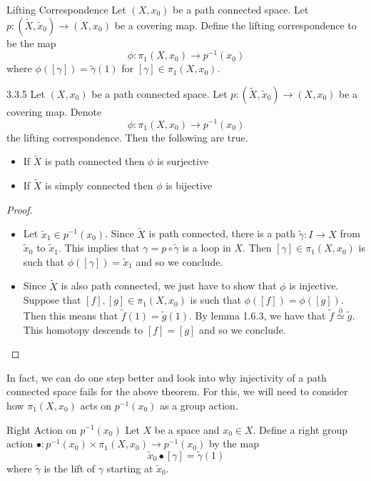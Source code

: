 \documentclass[a4paper]{article}
\begin{document}
\begin{defn}{Lifting Correspondence}{} Let $(X,x_0)$ be a path connected space. Let $p:(\widetilde{X},\widetilde{x}_0)\to(X,x_0)$ be a covering map. Define the lifting correspondence to be the map $$\phi:\pi_1(X,x_0)\to p^{-1}(x_0)$$ where $\phi([\gamma])=\widetilde{\gamma}(1)$ for $[\gamma]\in\pi_1(X,x_0)$. 
\end{defn}

\begin{thm}{}{3.3.5} Let $(X,x_0)$ be a path connected space. Let $p:(\widetilde{X},\widetilde{x}_0)\to(X,x_0)$ be a covering map. Denote $$\phi:\pi_1(X,x_0)\to p^{-1}(x_0)$$ the lifting correspondence. Then the following are true. 
\begin{itemize}
\item If $\widetilde{X}$ is path connected then $\phi$ is surjective
\item If $\widetilde{X}$ is simply connected then $\phi$ is bijective
\end{itemize}
\begin{proof}~\\
\begin{itemize}
\item Let $\widetilde{x}_1\in p^{-1}(x_0)$. Since $\widetilde{X}$ is path connected, there is a path $\widetilde{\gamma}:I\to X$ from $\widetilde{x}_0$ to $\widetilde{x}_1$. This implies that $\gamma=p\circ\widetilde{\gamma}$ is a loop in $X$. Then $[\gamma]\in\pi_1(X,x_0)$ is such that $\phi([\gamma])=\widetilde{x}_1$ and so we conclude. 
\item Since $\widetilde{X}$ is also path connected, we just have to show that $\phi$ is injective. Suppose that $[f],[g]\in\pi_1(X,x_0)$ is such that $\phi([f])=\phi([g])$. Then this means that $\widetilde{f}(1)=\widetilde{g}(1)$. By lemma 1.6.3, we have that $\widetilde{f}\overset{\partial}{\simeq}\widetilde{g}$. This homotopy descends to $[f]=[g]$ and so we conclude. 
\end{itemize}
\end{proof}
\end{thm}

In fact, we can do one step better and look into why injectivity of a path connected space fails for the above theorem. For this, we will need to consider how $\pi_1(X,x_0)$ acts on $p^{-1}(x_0)$ as a group action. 

\begin{defn}{Right Action on $p^{-1}(x_0)$}{} Let $X$ be a space and $x_0\in X$. Define a right group action $\bullet:p^{-1}(x_0)\times\pi_1(X,x_0)\to p^{-1}(x_0)$ by the map $$\widetilde{x}_0\bullet[\gamma]=\widetilde{\gamma}(1)$$ where $\widetilde{\gamma}$ is the lift of $\gamma$ starting at $\widetilde{x}_0$. 
\end{defn}
\end{document}
